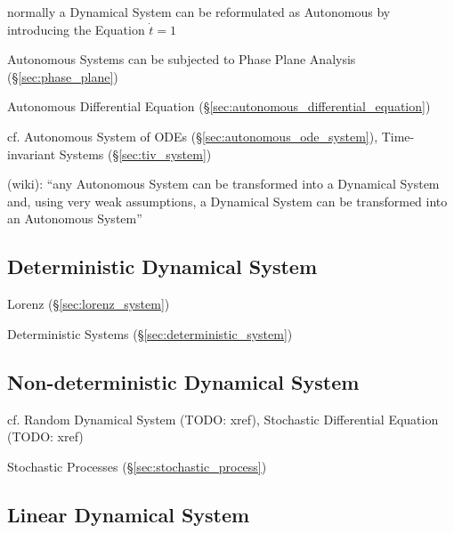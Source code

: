 normally a Dynamical System can be reformulated as Autonomous by introducing
the Equation $\dot{t} = 1$

Autonomous Systems can be subjected to Phase Plane Analysis
(\S\ref{sec:phase_plane})

Autonomous Differential Equation (\S\ref{sec:autonomous_differential_equation})

cf. Autonomous System of ODEs (\S\ref{sec:autonomous_ode_system}),
Time-invariant Systems (\S\ref{sec:tiv_system})

(wiki): ``any Autonomous System can be transformed into a Dynamical System and,
using very weak assumptions, a Dynamical System can be transformed into an
Autonomous System''




\subsection{Deterministic Dynamical System}
\label{sec:deterministic_dynamical_system}

Lorenz (\S\ref{sec:lorenz_system})

\fist Deterministic Systems (\S\ref{sec:deterministic_system})



\subsection{Non-deterministic Dynamical System}
\label{sec:nondeterministic_dynamical_system}

cf. Random Dynamical System (TODO: xref), Stochastic Differential Equation
(TODO: xref)

\fist Stochastic Processes (\S\ref{sec:stochastic_process})



\subsection{Linear Dynamical System}\label{sec:linear_dynamical_system}


